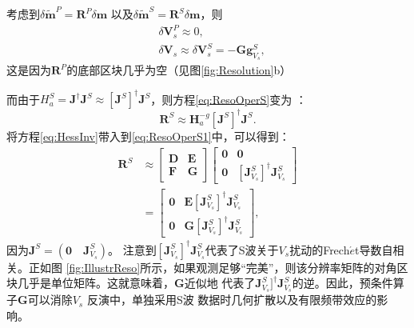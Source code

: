 考虑到$\delta \tilde{\mathbf{m}}^P=\mathbf{R}^P\delta \mathbf{m}$ 以及$\delta \tilde{\mathbf{m}}^S=\mathbf{R}^S\delta \mathbf{m}$，则
\begin{equation}
\begin{split}
        &\delta \mathbf{V}^P_s\approx0, \\
        &\delta \mathbf{V}_s \approx \delta
        \mathbf{V}^S_s=-\mathbf{G}\mathbf{g}^S_{V_s},
        \label{eq:gradGN}
\end{split}
\end{equation}
这是因为$\mathbf{R}^P$的底部区块几乎为空（见图\ref{fig:Resolution}b）

而由于$H^S_a=\mathbf{J}^{\dagger}\mathbf{J}^S\approx[\mathbf{J}^S]^{\dagger}\mathbf{J}^S$，则方程\eqref{eq:ResoOperS}变为
：
\begin{equation}
        \mathbf{R}^S\approx\mathbf{H}^{-g}_a[\mathbf{J}^S]^{\dagger}\mathbf{J}^S.
        \label{eq:ResoOperS1}
\end{equation}
将方程\eqref{eq:HessInv}带入到\eqref{eq:ResoOperS1}中，可以得到：
\begin{equation}
        \begin{split}
        \mathbf{R}^S
        &\approx
    \begin{bmatrix}
                \mathbf{D}&\mathbf{E} \\
                \mathbf{F}&\mathbf{G}
        \end{bmatrix}
    \begin{bmatrix}
        \mathbf{0}&\mathbf{0}\\
        \mathbf{0}&[\mathbf{J}^S_{V_s}]^{\dagger}\mathbf{J}_{V_s}^S
        \end{bmatrix}\\
        &=
    \begin{bmatrix}
                \mathbf{0}&\mathbf{E}[\mathbf{J}^S_{V_s}]^{\dagger}\mathbf{J}^S_{V_s}\\
                \mathbf{0}&\mathbf{G}[\mathbf{J}^S_{V_s}]^{\dagger}\mathbf{J}^S_{V_s}
        \end{bmatrix},
        \end{split}
        \label{eq:ResoOperS2}
\end{equation}
因为$\mathbf{J}^S=(\mathbf{0}\quad\mathbf{J}^S_{V_s})$。
注意到$[\mathbf{J}^S_{V_s}]^{\dagger}\mathbf{J}^S_{V_s}$代表了S波关于$V_s$扰动的Frech{$\acute{e}$}t导数自相关。正如图
\ref{fig:IllustrReso}所示，如果观测足够“完美”，则该分辨率矩阵的对角区块几乎是单位矩阵。这就意味着，$\mathbf{G}$近似地
代表了$\mathbf{J}^S_{V_s}]^{\dagger}\mathbf{J}^S_{V_s}$的逆。因此，预条件算子$\mathbf{G}$可以消除$V_s$ 反演中，单独采用S波
数据时几何扩散以及有限频带效应的影响。
